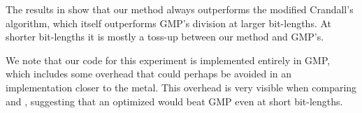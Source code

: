 The results in  show that our method always outperforms the modified Crandall's algorithm, which itself outperforms GMP's division at larger bit-lengths.
At shorter bit-lengths it is mostly a toss-up between our method and GMP's.

We note that our code for this experiment is implemented entirely in GMP, which includes some overhead that could perhaps be avoided in an implementation closer to the metal.
This overhead is very visible when comparing  and , suggesting that an optimized  would beat GMP even at short bit-lengths.

